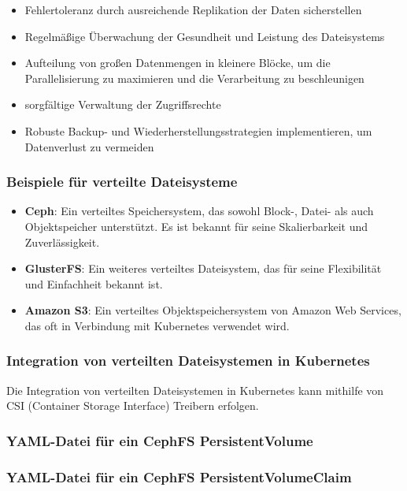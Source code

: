\begin{itemize}
    \item Fehlertoleranz durch ausreichende Replikation der Daten sicherstellen
    \item Regelmäßige Überwachung der Gesundheit und Leistung des Dateisystems
    \item Aufteilung von großen Datenmengen in kleinere Blöcke, um die Parallelisierung zu maximieren und die Verarbeitung zu beschleunigen
    \item sorgfältige Verwaltung der Zugriffsrechte
    \item Robuste Backup- und Wiederherstellungsstrategien implementieren, um Datenverlust zu vermeiden
\end{itemize}

\subsubsection{Beispiele für verteilte Dateisysteme}

\begin{itemize}
    \item \textbf{Ceph}: Ein verteiltes Speichersystem, das sowohl Block-, Datei- als auch Objektspeicher unterstützt. Es ist bekannt für seine Skalierbarkeit und Zuverlässigkeit.
    \item \textbf{GlusterFS}: Ein weiteres verteiltes Dateisystem, das für seine Flexibilität und Einfachheit bekannt ist.
    \item \textbf{Amazon S3}: Ein verteiltes Objektspeichersystem von Amazon Web Services, das oft in Verbindung mit Kubernetes verwendet wird.
\end{itemize}

\subsubsection{Integration von verteilten Dateisystemen in Kubernetes}
Die Integration von verteilten Dateisystemen in Kubernetes kann mithilfe von CSI (Container Storage Interface) Treibern erfolgen.

\subsubsection{YAML-Datei für ein CephFS PersistentVolume}


\subsubsection{YAML-Datei für ein CephFS PersistentVolumeClaim}


